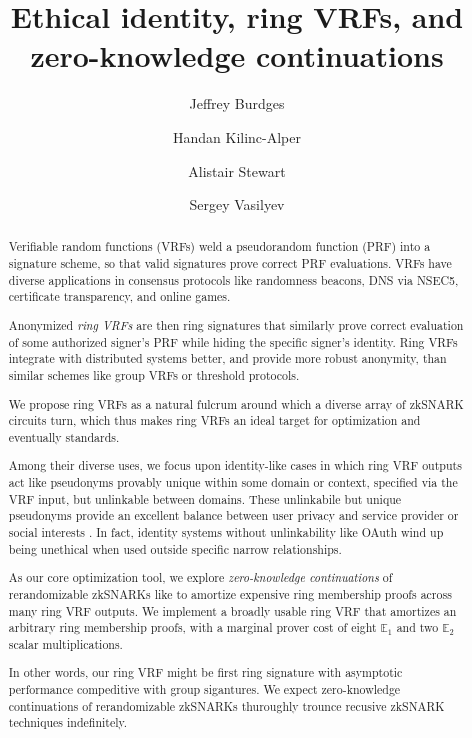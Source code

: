 \documentclass[runningheads,evcountsame,a4paper,11pt,orivec]{llncs}
\title{Ethical identity, ring VRFs, and zero-knowledge continuations}
\author{Jeffrey Burdges \and Handan Kilinc-Alper \and Alistair Stewart \and Sergey Vasilyev}
\date{}
\institute{Web 3.0 Foundation}
\begin{document}
	
\maketitle

\begin{abstract}
Verifiable random functions (VRFs) weld a pseudorandom function (PRF) into
a signature scheme, so that valid signatures prove correct PRF evaluations.
VRFs have diverse applications in consensus protocols like randomness
beacons, DNS via NSEC5, certificate transparency, and online games.

Anonymized {\em ring VRFs} are then ring signatures that similarly prove
correct evaluation of some authorized signer's PRF while hiding the
specific signer's identity.
Ring VRFs integrate with distributed systems better, and provide more robust
anonymity, than similar schemes like group VRFs or threshold protocols.


We propose ring VRFs as a natural fulcrum around which a diverse array of
zkSNARK circuits turn, which thus makes ring VRFs an ideal target
for optimization and eventually standards. 

%

Among their diverse uses, we focus upon identity-like cases in which
ring VRF outputs act like pseudonyms provably unique within some domain or
context, specified via the VRF input, but unlinkable between domains. 
These unlinkabile but unique pseudonyms provide an excellent balance between
user privacy and service provider or social interests \cite{pop2008}.
%
In fact, identity systems without unlinkability like OAuth wind up being
unethical when used outside specific narrow relationships.

%

As our core optimization tool, we explore {\em zero-knowledge continuations}
of rerandomizable zkSNARKs like \cite{groth16} to amortize expensive
ring membership proofs across many ring VRF outputs. 
%
We implement a broadly usable ring VRF that amortizes an arbitrary
ring membership proofs, with a marginal prover cost
 of eight $\mathbb{E}_1$ and two $\mathbb{E}_2$ scalar multiplications.

In other words, our ring VRF might be first ring signature with asymptotic
performance compeditive with group sigantures.
%
We expect zero-knowledge continuations of rerandomizable zkSNARKs
thuroughly trounce recusive zkSNARK techniques indefinitely.
\end{abstract}



% 
















\end{document}
